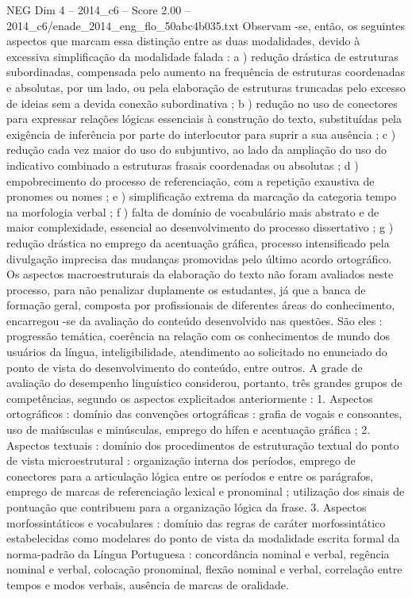 \begin{textsample}{NEG Dim 4 – 2014\_c6 – Score 2.00 – 2014\_c6/enade\_2014\_eng\_flo\_50abc4b035.txt}
Observam -se, então, os seguintes aspectos que marcam essa distinção entre as duas modalidades, devido à excessiva simplificação da modalidade falada : a ) redução drástica de estruturas subordinadas, compensada pelo aumento na frequência de estruturas coordenadas e absolutas, por um lado, ou pela elaboração de estruturas truncadas pelo excesso de ideias sem a devida conexão subordinativa ; b ) redução no uso de conectores para expressar relações lógicas essenciais à construção do texto, substituídas pela exigência de inferência por parte do interlocutor para suprir a sua ausência ; c ) redução cada vez maior do uso do subjuntivo, ao lado da ampliação do uso do indicativo combinado a estruturas frasais coordenadas ou absolutas ; d ) empobrecimento do processo de referenciação, com a repetição exaustiva de pronomes ou nomes ; e ) simplificação extrema da marcação da categoria tempo na morfologia verbal ; f ) falta de domínio de vocabulário mais abstrato e de maior complexidade, essencial ao desenvolvimento do processo dissertativo ; g ) redução drástica no emprego da acentuação gráfica, processo intensificado pela divulgação imprecisa das mudanças promovidas pelo último acordo ortográfico.
Os aspectos macroestruturais da elaboração do texto não foram avaliados neste processo, para não penalizar duplamente os estudantes, já que a banca de formação geral, composta por profissionais de diferentes áreas do conhecimento, encarregou -se da avaliação do conteúdo desenvolvido nas questões.
São eles : progressão temática, coerência na relação com os conhecimentos de mundo dos usuários da língua, inteligibilidade, atendimento ao solicitado no enunciado do ponto de vista do desenvolvimento do conteúdo, entre outros.
A grade de avaliação do desempenho linguístico considerou, portanto, três grandes grupos de competências, segundo os aspectos explicitados anteriormente : 1.
Aspectos ortográficos : domínio das convenções ortográficas : grafia de vogais e consoantes, uso de maiúsculas e minúsculas, emprego do hífen e acentuação gráfica ; 2.
Aspectos textuais : domínio dos procedimentos de estruturação textual do ponto de vista microestrutural : organização interna dos períodos, emprego de conectores para a articulação lógica entre os períodos e entre os parágrafos, emprego de marcas de referenciação lexical e pronominal ; utilização dos sinais de pontuação que contribuem para a organização lógica da frase. 3.
Aspectos morfossintáticos e vocabulares : domínio das regras de caráter morfossintático estabelecidas como modelares do ponto de vista da modalidade escrita formal da norma-padrão da Língua Portuguesa : concordância nominal e verbal, regência nominal e verbal, colocação pronominal, flexão nominal e verbal, correlação entre tempos e modos verbais, ausência de marcas de oralidade.

\end{textsample}
